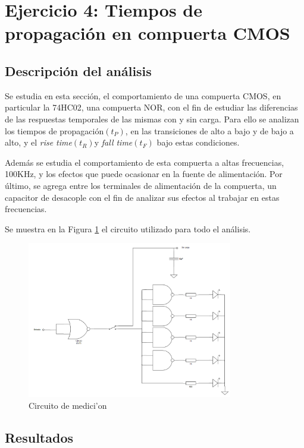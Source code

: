 \section{Ejercicio 4: Tiempos de propagaci\'on en compuerta CMOS}


\subsection{Descripci\'on del an\'alisis}
Se estudia en esta secci\'on, el comportamiento de una compuerta CMOS, en particular la 74HC02, una compuerta NOR, con el fin de estudiar las diferencias de las respuestas temporales de las mismas con y sin carga. Para ello se analizan los tiempos de propagaci\'on$(t_P)$, en las transiciones de alto a bajo y de bajo a alto, y el \textit{rise time}$(t_R) $y \textit{fall time}$(t_F)$ bajo estas condiciones.

Adem\'as se estudia el comportamiento de esta compuerta a altas frecuencias, 100KHz, y los efectos que puede ocasionar en la fuente de alimentaci\'on. Por \'ultimo, se agrega entre los terminales de alimentaci\'on de la compuerta, un capacitor de desacople con el fin de analizar sus efectos al trabajar en estas frecuencias.

Se muestra en la Figura \ref{fig:LOAD_CIRC} el circuito utilizado  para todo el an\'alisis.
\begin{figure}[H]
    \centering
    \includegraphics[width=0.8\textwidth]{../EJ4/Recursos/LOAD_CIRC}
    \caption{Circuito de medici'on}
    \label{fig:LOAD_CIRC}
\end{figure}

\subsection{Resultados}

